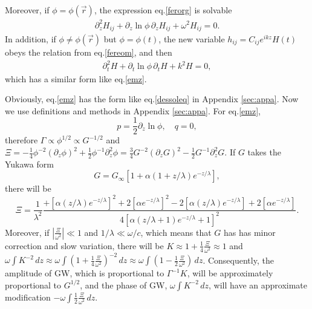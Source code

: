 \documentclass[
    jor,
    amsmath,amssymb,preprint,
    superscriptaddress,
]{revtex4-2}
\begin{document}
Moreover, if $\phi = \phi(\vec{r})$, the expression eq.\eqref{ferorg} is solvable
\begin{equation}\label{emz}
\begin{aligned}
\partial_z^2 H_{ij} + \partial_z \ln\phi\,\partial_z H_{ij} + \omega^2 H_{ij} = 0.
\end{aligned}
\end{equation}
In addition, if $\phi \neq \phi(\vec{r})$ but $\phi = \phi(t)$, the new variable $h_{ij} = C_{ij}e^{ikz}H(t)$ obeys the relation from eq.\eqref{fereom}, and then
\begin{equation}\label{emt}
\begin{aligned}
\partial_t^2 H + \partial_t\ln\phi \,\partial_t H  + k^2H= 0,
\end{aligned}
\end{equation}
which has a similar form like eq.\eqref{emz}.

Obviously, eq.\eqref{emz} has the form like eq.\eqref{dessoleq} in Appendix \ref{sec:appa}. Now we use definitions and methods in Appendix \ref{sec:appa}. For eq.\eqref{emz},
\begin{equation}
    p=\frac{1}{2}\partial_z \ln\phi,\quad q=0,
\end{equation}
therefore $\Gamma\propto\phi^{1/2}\propto G^{-1/2}$ and $\Xi=-\frac{1}{4}\phi^{-2}(\partial_z\phi)^2+\frac{1}{2}\phi^{-1}\partial_z^2\phi=\frac{3}{4}G^{-2}(\partial_zG)^2-\frac{1}{2}G^{-1}\partial_z^2G$. If $G$ takes the Yukawa form~\cite{Adelberger2003}
\begin{equation}\label{Yukawa}
    G=G_\infty[1+\alpha(1+z/\lambda)e^{-z/\lambda}],
\end{equation}
there will be
\begin{equation}
    \Xi=\frac{1}{\lambda^2}\frac{+[\alpha(z/\lambda)e^{-z/\lambda}]^2+2[\alpha e^{-z/\lambda}]^2-2[\alpha(z/\lambda)e^{-z/\lambda}]+2[\alpha e^{-z/\lambda}]}{4[\alpha(z/\lambda+1)e^{-z/\lambda}+1]^2}.
\end{equation}
Moreover, if $\left\lvert\frac{ \Xi}{\omega^2}\right\rvert \ll 1$ and $1/\lambda\ll\omega/c$, which means that $G$ has has minor correction and slow variation, there will be $K\approx1+\frac{1}{4}\frac{\Xi}{\omega^2}\approx1$ and $\omega\int K^{-2}\,d z\approx\omega\int (1+\frac{1}{4}\frac{\Xi}{\omega^2})^{-2}\,d z\approx\omega\int (1-\frac{1}{2}\frac{\Xi}{\omega^2})\,d z$. Consequently, the amplitude of GW, which is proportional to $\Gamma^{-1}K$, will be approximately proportional to $G^{1/2}$, and the phase of GW, $\omega\int K^{-2}\,d z$, will have an approximate modification $-\omega\int \frac{1}{2}\frac{\Xi}{\omega^2}\,d z$.
\end{document}
